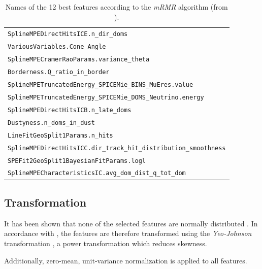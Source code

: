 \begin{table}
    \centering
    \caption{
      Names of the 12 best features according to the \emph{mRMR} algorithm (from \cite{dsea_jan}).
    }
    \label{tab:features_best}
    \begin{tabular}{l}
        \toprule
        \texttt{SplineMPEDirectHitsICE.n\_dir\_doms} \\
        \texttt{VariousVariables.Cone\_Angle} \\
        \texttt{SplineMPECramerRaoParams.variance\_theta} \\
        \texttt{Borderness.Q\_ratio\_in\_border} \\
        \texttt{SplineMPETruncatedEnergy\_SPICEMie\_BINS\_MuEres.value} \\
        \texttt{SplineMPETruncatedEnergy\_SPICEMie\_DOMS\_Neutrino.energy} \\
        \texttt{SplineMPEDirectHitsICB.n\_late\_doms} \\
        \texttt{Dustyness.n\_doms\_in\_dust} \\
        \texttt{LineFitGeoSplit1Params.n\_hits} \\
        \texttt{SplineMPEDirectHitsICC.dir\_track\_hit\_distribution\_smoothness} \\
        \texttt{SPEFit2GeoSplit1BayesianFitParams.logl} \\
        \texttt{SplineMPECharacteristicsIC.avg\_dom\_dist\_q\_tot\_dom} \\
        \bottomrule
    \end{tabular}
\end{table}


\subsection{Transformation}
It has been shown that none of the selected features are normally distributed \cite{dsea_jan}.
In accordance with \cite{dsea_jan},
the features are therefore transformed using the \emph{Yeo-Johnson} transformation \cite{yeo_johnson},
a power transformation which reduces skewness.

Additionally, zero-mean, unit-variance normalization is applied to all features.


